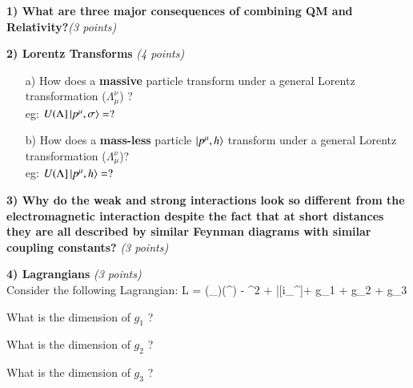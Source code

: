 {\large



\textbf{1) What are three major consequences of combining QM and Relativity?}\hfill \textit{(3 points)}\\

\vspace{2.5in}


\textbf{2) Lorentz Transforms } \hfill \textit{(4 points)}\\
\begin{itemize}
\item[a)] How does a \textbf{massive} particle transform under a general Lorentz transformation ($\Lambda_\mu^\nu$) ?\\
eg:  $U(\Lambda] \ket{p^\mu,\sigma} = ?$ 
\vspace*{1in}

\item[b)] How does a \textbf{mass-less} particle $\ket{p^\mu,h}$ transform under a general Lorentz transformation ($\Lambda_\mu^\nu$)?\\
eg:  $U(\Lambda] \ket{p^\mu,h} = ?$ 
\vspace*{1in}

\end{itemize}


\textbf{3) Why do the weak and strong interactions look so different from the electromagnetic interaction despite the fact that at short distances they are all described by similar Feynman diagrams with similar coupling constants?} \hfill \textit{(3 points)}\\


\clearpage

\textbf{4) Lagrangians } \hfill \textit{(3 points)}\\
Consider the following Lagrangian:
\be
L =  (\partial_\mu\phi)(\partial^\mu\phi) - \phi^2 + \bar{\psi}[i\gamma_\mu\partial^\mu]\psi + g_1 \phi \psi \psi + g_2 \psi \psi \psi \psi + g_3 \phi \phi \phi \phi
\ee

\bi
\item[a)] What is the dimension of $g_1$ ? 
\vspace*{0.5in}
\item[b)] What is the dimension of $g_2$ ? 
\vspace*{0.5in}
\item[c)] What is the dimension of $g_3$ ? 
\vspace*{0.5in}
\ei


}
